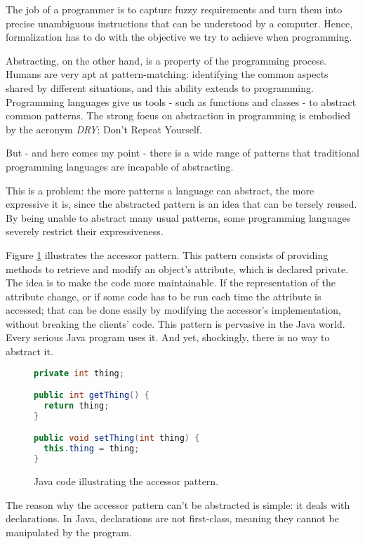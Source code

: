 The job of a programmer is to capture fuzzy requirements and turn them into
precise unambiguous instructions that can be understood by a computer. Hence,
formalization has to do with the objective we try to achieve when programming.

Abstracting, on the other hand, is a property of the programming process. Humans
are very apt at pattern-matching: identifying the common aspects shared by
different situations, and this ability extends to programming. Programming
languages give us tools - such as functions and classes - to abstract common
patterns. The strong focus on abstraction in programming is embodied by the
acronym \emph{DRY}: Don't Repeat Yourself.

But - and here comes my point - there is a wide range of patterns that
traditional programming languages are incapable of abstracting.

This is a problem: the more patterns a language can abstract, the more
expressive it is, since the abstracted pattern is an idea that can be tersely
reused. By being unable to abstract many usual patterns, some programming
languages severely restrict their expressiveness.

Figure \ref{pattern_example} illustrates the accessor pattern. This pattern
consists of providing methods to retrieve and modify an object's attribute,
which is declared private. The idea is to make the code more maintainable. If
the representation of the attribute change, or if some code has to be run each
time the attribute is accessed; that can be done easily by modifying the
accessor's implementation, without breaking the clients' code. This pattern is
pervasive in the Java world. Every serious Java program uses it. And yet,
shockingly, there is no way to abstract it.

\begin{figure}[here]
\small
\begin{lstlisting}[frame=single,language=Java]
private int thing;

public int getThing() {
  return thing;
}

public void setThing(int thing) {
  this.thing = thing;
}
\end{lstlisting}
\caption{Java code illustrating the accessor pattern.}
\label{pattern_example}
\end{figure}

The reason why the accessor pattern can't be abstracted is simple: it deals with
declarations. In Java, declarations are not first-class, meaning they cannot be
manipulated by the program.

